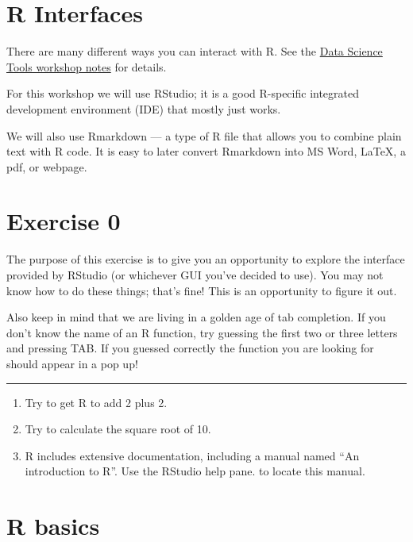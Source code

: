 \documentclass[]{book}
\begin{document}
\section{R Interfaces}\label{r-interfaces}

There are many different ways you can interact with R. See the
\href{http://tutorials.iq.harvard.edu/DataScienceTools/DataScienceTools.html}{Data
Science Tools workshop notes} for details.

For this workshop we will use RStudio; it is a good R-specific
integrated development environment (IDE) that mostly just works.

We will also use Rmarkdown --- a type of R file that allows you to
combine plain text with R code. It is easy to later convert Rmarkdown
into MS Word, LaTeX, a pdf, or webpage.

\section{Exercise 0}\label{exercise-0}

The purpose of this exercise is to give you an opportunity to explore
the interface provided by RStudio (or whichever GUI you've decided to
use). You may not know how to do these things; that's fine! This is an
opportunity to figure it out.

Also keep in mind that we are living in a golden age of tab completion.
If you don't know the name of an R function, try guessing the first two
or three letters and pressing TAB. If you guessed correctly the function
you are looking for should appear in a pop up!

\begin{center}\rule{0.5\linewidth}{\linethickness}\end{center}

\begin{enumerate}
\def\labelenumi{\arabic{enumi}.}
\item
  Try to get R to add 2 plus 2.
\item
  Try to calculate the square root of 10.
\item
  R includes extensive documentation, including a manual named ``An
  introduction to R''. Use the RStudio help pane. to locate this manual.
\end{enumerate}

\section{R basics}\label{r-basics}
\end{document}
